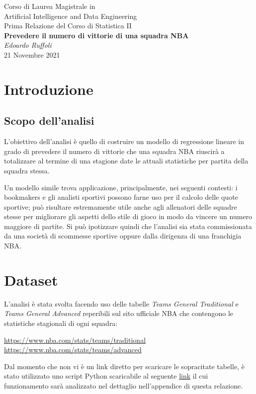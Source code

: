 \documentclass[11pt,a4paper]{article}
\begin{document}
\begin{center}
	\Large{Corso di Laurea Magistrale in \\
	Artificial Intelligence and	Data Engineering}\\
	\vspace{0.2cm}
	\large{Prima Relazione del Corso di Statistica II}\\
	\vspace{0.5cm}
	\Large\textbf{Prevedere il numero di vittorie di una squadra NBA}\\
	\vspace{0.5cm}
	\large\emph{Edoardo Ruffoli}\\
	\vspace{0.5cm}
	\normalsize{21 Novembre 2021}
\end{center}

\tableofcontents
\newpage

\section{Introduzione}
\subsection{Scopo dell'analisi}
L'obiettivo dell'analisi è quello di costruire un modello di regressione lineare in grado di prevedere il numero di vittorie che una squadra NBA riuscirà a totalizzare al termine di una stagione date le attuali statistiche per partita della squadra stessa. 

Un modello simile trova applicazione, principalmente, nei seguenti contesti: i bookmakers e gli analisti sportivi possono farne uso per il calcolo delle quote sportive; può risultare estremamente utile anche agli allenatori delle squadre stesse per migliorare gli aspetti dello stile di gioco in modo da vincere un numero maggiore di partite.
Si può ipotizzare quindi che l'analisi sia stata commissionata da una società di scommesse sportive oppure dalla dirigenza di una franchigia NBA.

\section{Dataset}
L'analisi è stata svolta facendo uso delle tabelle \emph{Teams General Traditional} e \emph{Teams General Advanced} reperibili sul sito ufficiale NBA che contengono le statistiche stagionali di ogni squadra:
\begin{center}
    \url{https://www.nba.com/stats/teams/traditional}\\
    \url{https://www.nba.com/stats/teams/advanced}\\
\end{center}
Dal momento che non vi è un link diretto per scaricare le sopracitate tabelle, è stato utilizzato uno script Python scaricabile al seguente \href{https://raw.githubusercontent.com/edoardoruffoli/Statistics/master/FirstProject/nba_stats_scraper.py}{link} il cui funzionamento sarà analizzato nel dettaglio nell'appendice di questa relazione.
\end{document}
